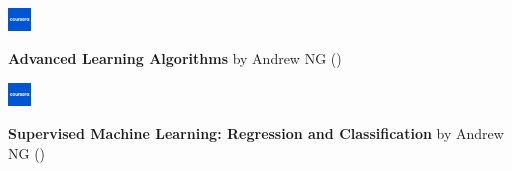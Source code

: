\documentclass[9pt, purple]{./template/cv} %
\begin{document}
\begin{minipage}{\linewidth}
    \vspace{6mm}
    
    \begin{minipage}[t]{\linewidth}
    
        \begin{minipage}{1cm}
            \vspace{-\baselineskip}
            \includegraphics[width=6mm]{img/coursera}\centering
        \end{minipage}
        \begin{minipage}{0.8\linewidth}
            \vspace{-\baselineskip}
            \textcolor{text!85}{\textbf{Advanced Learning Algorithms} \space \pipe \space by Andrew NG ()}
        \end{minipage}
    
    \end{minipage}

    \vspace{0.3cm}
    
    \begin{minipage}[t]{\linewidth}
    
        \begin{minipage}{1cm}
            \vspace{-\baselineskip}
            \includegraphics[width=6mm]{img/coursera}\centering
        \end{minipage}
        \begin{minipage}{0.8\linewidth}
            \vspace{-\baselineskip}
            \textcolor{text!85}{\textbf{Supervised Machine Learning: Regression and Classification} \space \pipe \space by Andrew NG ()}
        \end{minipage}
    
    \end{minipage}

    \vspace{0.3cm}
    
    \begin{minipage}[t]{\linewidth}
    

\end{minipage}
\end{minipage}
\end{document}

